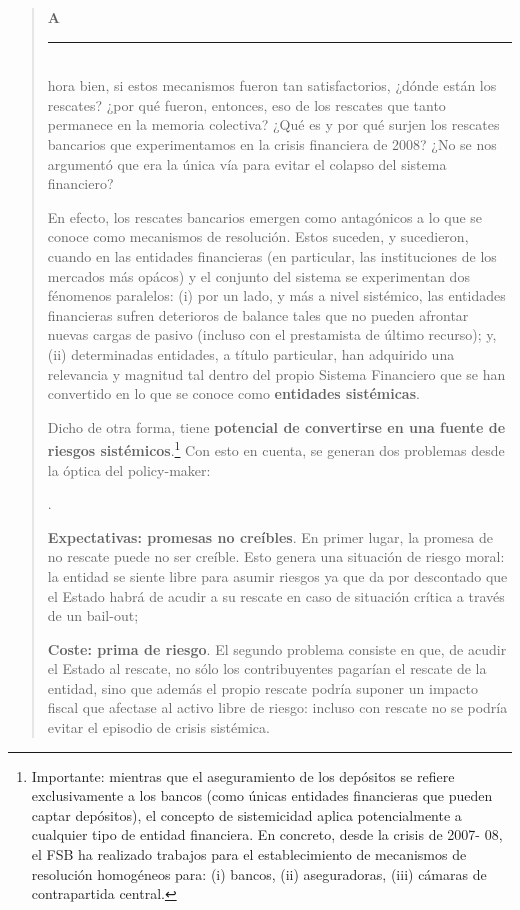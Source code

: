 \documentclass[10pt,a4paper]{article}
\newcounter{numitem}
\newenvironment{lnum}
      {\begin{list}{\arabic{numitem}.}{%
          \usecounter{numitem}%
          \setlength{\leftmargin}{1cm}%
          \setlength{\parskip}{3pt}%
          \setlength{\itemsep}{0pt}%
          \setlength{\parsep}{0pt}%
      }}
      {\end{list}}
\newenvironment{specialblock}[1]{%
      \begin{quote} %
      \small %
      \noindent\textbf{#1}\\[-0.3em] %
      \rule{\linewidth}{0.4pt}\\[0.6em]}{
      \end{quote}}
\begin{document}
\begin{specialblock}
    Ahora bien, si estos mecanismos fueron tan satisfactorios, ¿dónde están los rescates? ¿por qué fueron, entonces, eso de los rescates que tanto permanece en la memoria colectiva? ¿Qué es y por qué surjen los rescates bancarios que experimentamos en la crisis financiera de 2008? ¿No se nos argumentó que era la única vía para evitar el colapso del sistema financiero? 

    En efecto, los rescates bancarios emergen como antagónicos a lo que se conoce como mecanismos de resolución. Estos suceden, y sucedieron, cuando en las entidades financieras (en particular, las instituciones de los mercados más opácos) y el conjunto del sistema se experimentan dos fénomenos paralelos: (i) por un lado, y más a nivel sistémico, las entidades financieras sufren deterioros de balance tales que no pueden afrontar nuevas cargas de pasivo (incluso con el prestamista de último recurso); y, (ii) determinadas entidades, a título particular, han adquirido una relevancia y magnitud tal dentro del propio Sistema Financiero que se han convertido en lo que se conoce como \textbf{entidades sistémicas}. 
    
    Dicho de otra forma, tiene \textbf{potencial de convertirse en una fuente de riesgos sistémicos}.\footnote{%
        Importante: mientras que el aseguramiento de los depósitos se refiere exclusivamente a los bancos (como únicas entidades financieras que pueden captar depósitos), el concepto de sistemicidad aplica potencialmente a cualquier tipo de entidad financiera. En concreto, desde la crisis de 2007- 08, el FSB ha realizado trabajos para el establecimiento de mecanismos de resolución homogéneos para: (i) bancos, (ii) aseguradoras, (iii) cámaras de contrapartida central.
    } Con esto en cuenta, se generan dos problemas desde la óptica del policy-maker:
    \begin{lnum}
        \item \textbf{Expectativas: promesas no creíbles}. En primer lugar, la promesa de no rescate puede no ser creíble. Esto genera una situación de riesgo moral: la entidad se siente libre para asumir riesgos ya que da por descontado que el Estado habrá de acudir a su rescate en caso de situación crítica a través de un bail-out;
        \item \textbf{Coste: prima de riesgo}. El segundo problema consiste en que, de acudir el Estado al rescate, no sólo los contribuyentes pagarían el rescate de la entidad, sino que además el propio rescate podría suponer un impacto fiscal que afectase al activo libre de riesgo: incluso con rescate no se podría evitar el episodio de crisis sistémica. 
    \end{lnum}
    

\end{specialblock}
\end{document}

